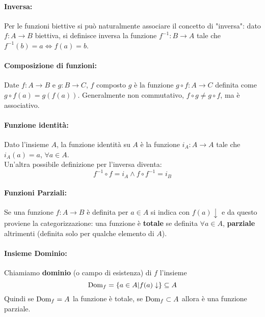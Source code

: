 \paragraph{Inversa:} Per le funzioni biettive si può naturalmente associare il concetto di "inversa": dato $f: A \rightarrow B$ biettiva, si definisce inversa la funzione $f^{-1}: B \rightarrow A$ tale che $f^{-1} (b) = a \Leftrightarrow f(a) = b$.\\

\paragraph{Composizione di funzioni:} Date $f: A \rightarrow B$ e $g: B \rightarrow C$, $f$ composto $g$ è la funzione $g \circ f: A \rightarrow C$ definita come $g \circ f(a) = g(f(a))$. Generalmente non commutativo, $f \circ g \neq g \circ f$, ma è associativo.\\

\paragraph{Funzione identità:} Dato l'insieme $A$, la funzione identità su $A$ è la funzione $i_A: A \rightarrow A$ tale che $i_A (a) = a$, $\forall a \in A$.\\

Un'altra possibile definizione per l'inversa diventa:
$$ f^{-1} \circ f = i_A \wedge f \circ f^{-1} = i_B $$


\paragraph{Funzioni Parziali:} Se una funzione $f: A \rightarrow B$ è definita per $a \in A$ si indica con $f(a) \downarrow$ e da questo proviene la categorizzazione: una funzione è \textbf{totale} se definita $\forall a \in A$, \textbf{parziale} altrimenti (definita solo per qualche elemento di $A$).\\

\paragraph{Insieme Dominio:} Chiamiamo \textbf{dominio} (o campo di esistenza) di $f$ l'insieme
$$ \text{Dom}_f = \left\{a \in A | f(a) \downarrow \right\} \subseteq A $$
Quindi se $\text{Dom}_f = A$ la funzione è totale, se $\text{Dom}_f \subset A$ allora è una funzione parziale.\\


